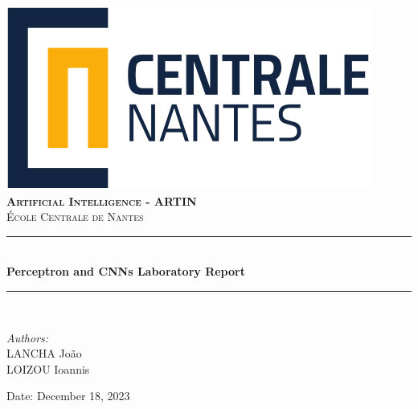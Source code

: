 \begin{titlepage}

\newcommand{\HRule}{\rule{\linewidth}{0.5mm}} %





\begin{center} %


\includegraphics[width = 6 cm]{./figures/ecn}\\[1.5cm] 
\textbf{\textsc{\Large Artificial Intelligence - ARTIN}}\\[1.0cm] 
\textsc{\Large École Centrale de Nantes}\\[0.5cm] 


\HRule \\[0.4cm]
{ \huge \bfseries Perceptron and CNNs Laboratory Report}\\  %
\HRule \\[1.5cm]
\end{center}

\begin{flushleft} \large
\textit{Authors:}\\
LANCHA João\\
LOIZOU Ioannis\\
\end{flushleft}
\vspace{8cm}
\makeatletter
Date: December 18, 2023 

\vfill %



\makeatother


\end{titlepage}

